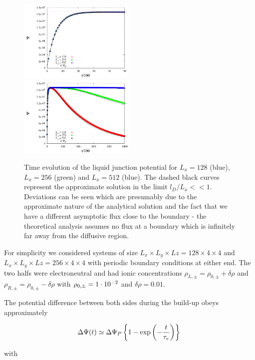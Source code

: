 \begin{figure}[h!t]
\includegraphics[width=0.495\textwidth]{./pics/test_lj_zoom1.pdf}
\includegraphics[width=0.495\textwidth]{./pics/test_lj_zoom3.pdf}
\caption{Time evolution of the liquid junction potential for $L_x=128$ (blue), $L_x=256$ (green) and $L_x=512$ (blue). The dashed black curves represent the approximate solution in the limit $l_D/L_x<<1$. Deviations can be seen which are presumably due
to the approximate nature of the analytical solution and the fact that we
have a different asymptotic flux close to the boundary - the theoretical 
analysis assumes no flux at a boundary which is infinitely far away from
the diffusive region.} 
\label{fig3} 
\end{figure}

For simplicity we considered systems of size 
$L_x\times L_y\times Lz=128\times4\times4$ and 
$L_x\times L_y\times Lz=256\times4\times4$ with
periodic boundary conditions at either end.
The two halfs were electroneutral and had ionic concentrations 
$\rho_{L,\pm}=\rho_{0,\pm} + \delta\rho$ and 
$\rho_{R,\pm}=\rho_{0,\pm} - \delta\rho$ 
with $\rho_{0,\pm}=1\cdot10^{-2}$ and $\delta\rho = 0.01$.

The potential difference between both sides during the build-up 
obeys approximately

\begin{equation}
\Delta\Psi(t)\simeq\Delta\Psi_P \left\{1-\exp\left(-\frac{t}{\tau_e}\right)\right\}\\
\end{equation}

with 

